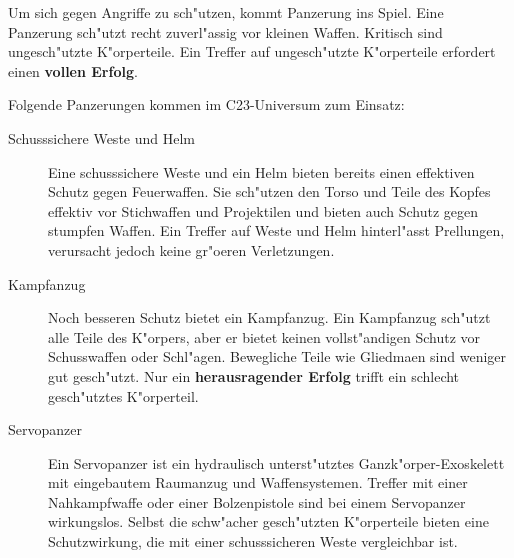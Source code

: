 Um sich gegen Angriffe zu sch"utzen, kommt Panzerung ins Spiel. Eine Panzerung sch"utzt recht zuverl"assig vor kleinen Waffen. Kritisch sind ungesch"utzte K"orperteile. Ein Treffer auf ungesch"utzte K"orperteile erfordert einen \textbf{vollen Erfolg}.

Folgende Panzerungen kommen im C23-Universum zum Einsatz:

\begin{description}
    \item[Schusssichere Weste und Helm] Eine schusssichere Weste und ein Helm bieten bereits einen effektiven Schutz gegen Feuerwaffen. Sie 
        sch"utzen den Torso und Teile des Kopfes effektiv vor Stichwaffen und Projektilen und bieten auch Schutz gegen stumpfen Waffen. Ein Treffer auf Weste und Helm hinterl"asst Prellungen, verursacht jedoch keine gr"o\3eren Verletzungen.
    \item[Kampfanzug] Noch besseren Schutz bietet ein Kampfanzug. Ein Kampfanzug sch"utzt alle Teile des K"orpers, aber er bietet keinen 
        vollst"andigen Schutz vor Schusswaffen oder Schl"agen. Bewegliche Teile wie Gliedma\3en sind weniger gut gesch"utzt. Nur ein \textbf{herausragender Erfolg} trifft ein schlecht gesch"utztes K"orperteil.
    \item[Servopanzer] Ein Servopanzer ist ein hydraulisch unterst"utztes Ganzk"orper-Exoskelett mit eingebautem Raumanzug und 
        Waffensystemen. Treffer mit einer Nahkampfwaffe oder einer Bolzenpistole sind bei einem Servopanzer wirkungslos. Selbst die schw"acher gesch"utzten K"orperteile bieten eine Schutzwirkung, die mit einer schusssicheren Weste vergleichbar ist.
\end{description}

